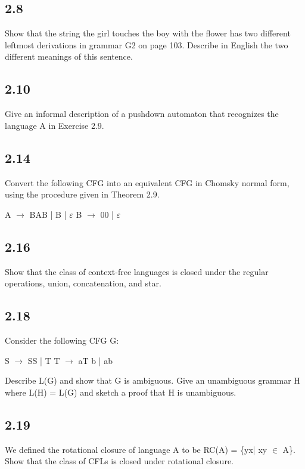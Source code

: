 \subsection*{2.8}

Show that the string the girl touches the boy with the flower has two different leftmost derivations in grammar G2 on page 103. Describe in English the two different meanings of this sentence.


\subsection*{2.10}

Give an informal description of a pushdown automaton that recognizes the language A in Exercise 2.9.


\subsection*{2.14}

Convert the following CFG into an equivalent CFG in Chomsky normal form, using the procedure given in Theorem 2.9.

A $\to$ BAB | B | $\varepsilon$ B $\to$ 00 | $\varepsilon$


\subsection*{2.16}

Show that the class of context-free languages is closed under the regular operations, union, concatenation, and star.


\subsection*{2.18}

Consider the following CFG G:

S $\to$ SS | T T $\to$ aT b | ab

Describe L(G) and show that G is ambiguous. Give an unambiguous grammar H where L(H) = L(G) and sketch a proof that H is unambiguous.


\subsection*{2.19}

We defined the rotational closure of language A to be RC(A) = \{yx| xy $\in$ A\}. Show that the class of CFLs is closed under rotational closure.


